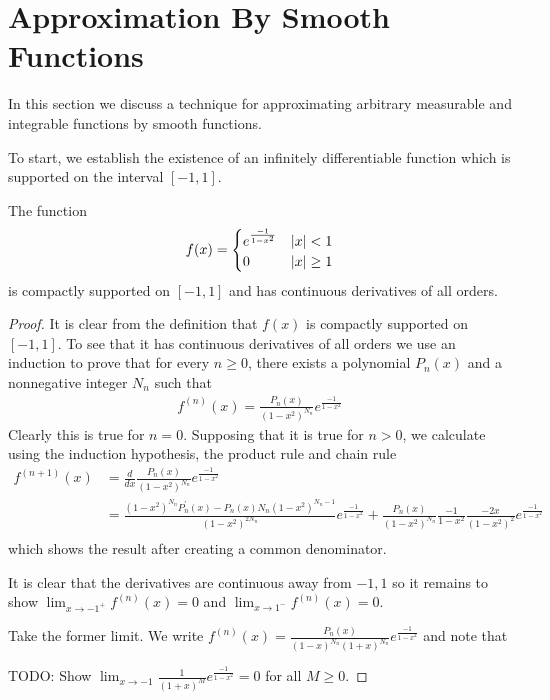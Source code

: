 \section{Approximation By Smooth Functions}
In this section we discuss a technique for approximating arbitrary
measurable and integrable functions by smooth functions.  

To start, we establish the existence of an infinitely differentiable
function which is supported on the interval $[-1,1]$.

\begin{lem}\label{ExistenceOfBumpFunction}The function 
\begin{align*}
f(x) = \begin{cases}
e^\frac{-1}{1-x^2} & \left \vert x \right \vert < 1\\
0 & \left \vert x \right \vert \geq 1
\end{cases}
\end{align*} is compactly supported on $[-1,1]$ and has continuous
derivatives of all orders.
\end{lem}
\begin{proof}
It is clear from the definition that $f(x)$ is compactly supported on
$[-1,1]$.  To see that it has continuous derivatives of all orders we
use an induction to prove that for every $n\geq 0$, there exists a
polynomial $P_n(x)$ and a nonnegative integer $N_n$ such that 
\begin{align*}
f^{(n)}(x) = \frac{P_n(x)}{(1 - x^2)^{N_n}} e^\frac{-1}{1-x^2}
\end{align*}
Clearly this is true for $n=0$.  Supposing that it is true for $n >0$,
we calculate using the induction hypothesis, the product rule and
chain rule
\begin{align*}
f^{(n+1)}(x) &= \frac{d}{dx}\frac{P_n(x)}{(1 - x^2)^{N_n}}
e^\frac{-1}{1-x^2} \\
&= \frac{(1 - x^2)^{N_n} P_n^\prime(x) - P_n(x) N_n (1- x^2)^{N_n
    -1}}{(1 - x^2)^{2N_n}}e^\frac{-1}{1-x^2} + \frac{P_n(x)}{(1 - x^2)^{N_n}}\frac{-1}{1-x^2} \frac{-2x}{(1-x^2)^2}
e^\frac{-1}{1-x^2} \\
\end{align*}
which shows the result after creating a common denominator.

It is clear that the derivatives are continuous away from ${-1,1}$ so
it remains to show $\lim_{x \to -1^+} f^{(n)}(x) = 0$ and $\lim_{x \to
  1^-} f^{(n)}(x) = 0$.

Take the former limit.  We write $f^{(n)}(x) = \frac{P_n(x)}{(1 -
  x)^{N_n}(1 + x)^{N_n}} e^\frac{-1}{1-x^2}$ and note that


TODO: Show $\lim_{x \to -1} \frac{1}{(1 + x)^M} e^\frac{-1}{1-x^2} = 0$
for all $M \geq 0$.
\end{proof}

